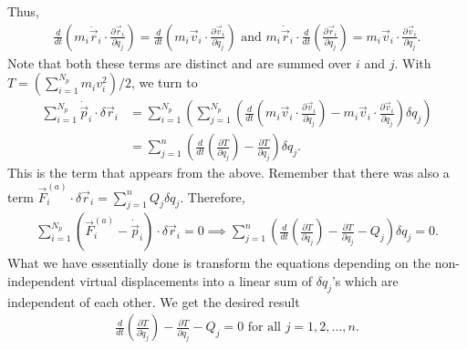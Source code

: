 Thus,
\begin{align}
    \frac{d}{dt} \left( m_{i} \ddot{\vec{r}}_{i} \cdot \frac{\partial \vec{r}_{i}}{\partial q_{j}} \right) = \frac{d}{dt} \left( m_{i} \vec{v}_{i} \cdot \frac{\partial \vec{v}_{i}}{\partial \dot{q}_{j}}\right) \text{ and } m_{i} \dot{\vec{r}}_{i} \cdot \frac{d}{dt} \left( \frac{\partial \vec{r}_{i}}{\partial q_{j}} \right) = m_{i} \vec{v}_{i} \cdot \frac{\partial \vec{v}_{i}}{\partial q_{j}}.
\end{align}
Note that both these terms are distinct and are summed over $i$ and $j$. With $T = (\sum_{i=1}^{N_{p}} m_{i}v_{i}^{2})/2$, we turn to
\begin{align}
    \sum_{i=1}^{N_{p}} \dot{\vec{p}}_{i} \cdot \delta \vec{r}_{i} &= \sum_{i=1}^{N_{p}} \left( \sum_{j=1}^{N_{p}} \left( \frac{d}{dt} \left( m_{i} \vec{v}_{i} \cdot \frac{\partial \vec{v}_{i}}{\partial \dot{q}_{j}} \right) - m_{i}\vec{v}_{i} \cdot \frac{\partial \vec{v}_{i}}{\partial q_{j}} \right) \delta q_{j} \right) \\
    &= \sum_{j=1}^{n} \left( \frac{d}{dt} \left( \frac{\partial T}{\partial \dot{q}_{j}} \right) - \frac{\partial T}{\partial q_{j}} \right) \delta q_{j}.
\end{align}
This is the term that appears from the above. Remember that there was also a term $\vec{F}_{i}^{(a)} \cdot \delta \vec{r}_{i} = \sum_{j=1}^{n} Q_{j} \delta q_{j}$. Therefore,
\begin{align}
    \sum_{i=1}^{N_{p}} (\vec{F}_{i}^{(a)} - \dot{\vec{p}}_{i}) \cdot \delta \vec{r}_{i} = 0 \implies \sum_{j=1}^{n} \left( \frac{d}{dt} \left( \frac{\partial T}{\partial \dot{q}_{j}} \right) - \frac{\partial T}{\partial q_{j}} -Q_{j}\right) \delta q_{j} = 0.
\end{align}
What we have essentially done is transform the equations depending on the non-independent virtual displacements into a linear sum of $\delta q_{j}$'s which are independent of each other. We get the desired result
\begin{align}
    \frac{d}{dt} \left( \frac{\partial T}{\partial \dot{q}_{j}} \right) - \frac{\partial T}{\partial q_{j}} - Q_{j} = 0 \text{ for all } j = 1,2,\ldots,n.
\end{align}

